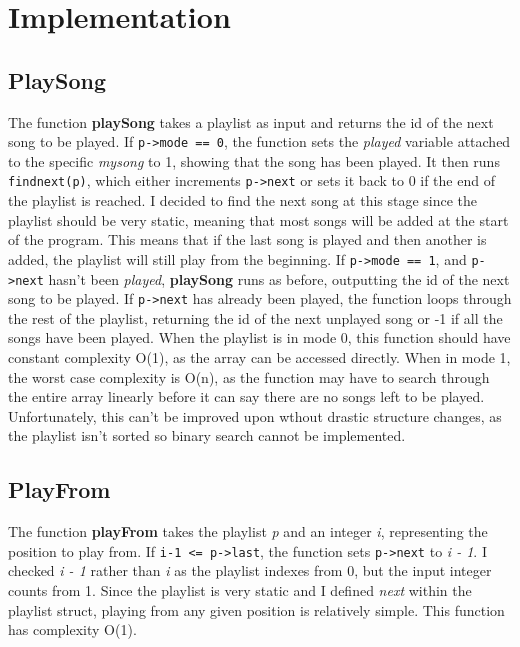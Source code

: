 \documentclass[11pt]{article}
\begin{document}
\section{Implementation}
\label{sec:orgd9e7520}

\subsection{PlaySong}
\label{sec:orgba5a591}

The function \textbf{playSong} takes a playlist as input and returns the id of the next song to be played.
If \texttt{p->mode == 0}, the function sets the \emph{played} variable attached to the specific \emph{mysong} to 1, showing that the song has been played. 
It then runs \texttt{findnext(p)}, which either increments \texttt{p->next} or sets it back to 0 if the end of the playlist is reached.
I decided to find the next song at this stage since the playlist should be very static, meaning that most songs will be added at the start of the program.
This means that if the last song is played and then another is added, the playlist will still play from the beginning.
If \texttt{p->mode == 1}, and \texttt{p->next} hasn't been \emph{played}, \textbf{playSong} runs as before, outputting the id of the next song to be played.
If \texttt{p->next} has already been played, the function loops through the rest of the playlist, returning the id of the next unplayed song or -1 if all the songs have been played.
When the playlist is in mode 0, this function should have constant complexity O(1), as the array can be accessed directly.
When in mode 1, the worst case complexity is O(n), as the function may have to search through the entire array linearly before it can say there are no songs left to be played.
Unfortunately, this can't be improved upon wthout drastic structure changes, as the playlist isn't sorted so binary search cannot be implemented.

\subsection{PlayFrom}
\label{sec:orgd74d7a9}

The function \textbf{playFrom} takes the playlist \emph{p} and an integer \emph{i}, representing the position to play from.
If \texttt{i-1 <= p->last}, the function sets \texttt{p->next} to \emph{i - 1}.
I checked \emph{i - 1} rather than \emph{i} as the playlist indexes from 0, but the input integer counts from 1.
Since the playlist is very static and I defined \emph{next} within the playlist struct, playing from any given position is relatively simple.
This function has complexity O(1).
\end{document}
